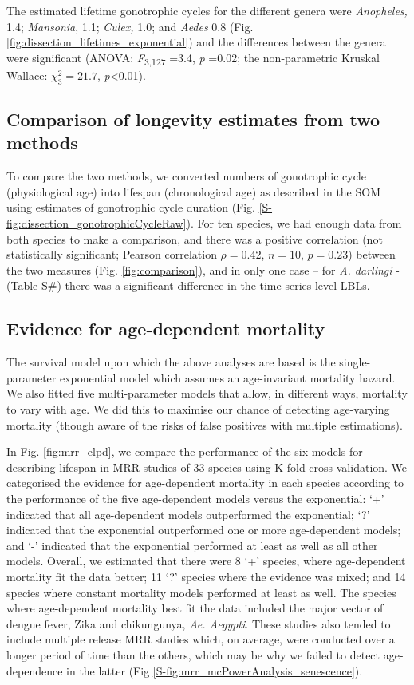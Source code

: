 \documentclass[]{article}
\begin{document}
The estimated lifetime gonotrophic cycles for the different genera were
\emph{Anopheles,} 1.4; \emph{Mansonia}, 1.1; \emph{Culex,} 1.0; and
\emph{Aedes} 0.8 (Fig. \ref{fig:dissection_lifetimes_exponential}) and the differences between the genera were
significant (ANOVA: \emph{F}\textsubscript{3,127} =3.4, \emph{p} =0.02;
the non-parametric Kruskal Wallace: \(\chi_{3}^{2} = 21.7\),
\emph{p}\textless{}0.01).

\subsection{Comparison of longevity estimates from two
methods}\label{comparison-of-longevity-estimates-from-two-methods}

To compare the two methods, we converted numbers of gonotrophic cycle
(physiological age) into lifespan (chronological age) as described in
the SOM using estimates of gonotrophic cycle duration (Fig. \ref{S-fig:dissection_gonotrophicCycleRaw}). For ten species, we had enough data from both
species to make a comparison, and there was a positive correlation (not
statistically significant; Pearson correlation $\rho=0.42$, $n=10$, $p=0.23$)
between the two measures (Fig. \ref{fig:comparison}), and in only one case -- for \emph{A.
darlingi} - (Table S\#) there was a significant difference in the
time-series level LBLs.

\subsection{Evidence for age-dependent
mortality}\label{evidence-for-age-dependent-mortality}

The survival model upon which the above analyses are based is the
single-parameter exponential model which assumes an age-invariant
mortality hazard. We also fitted five multi-parameter models that allow,
in different ways, mortality to vary with age. We did this to maximise
our chance of detecting age-varying mortality (though aware of the risks
of false positives with multiple estimations).

In Fig. \ref{fig:mrr_elpd}, we compare the performance of the six models for describing
lifespan in MRR studies of 33 species using K-fold cross-validation. We
categorised the evidence for age-dependent mortality in each species
according to the performance of the five age-dependent models versus the
exponential: `+' indicated that all age-dependent models outperformed
the exponential; `?' indicated that the exponential outperformed one or
more age-dependent models; and `-' indicated that the exponential
performed at least as well as all other models. Overall, we estimated
that there were 8 `+' species, where age-dependent mortality fit the
data better; 11 `?' species where the evidence was mixed; and 14 species
where constant mortality models performed at least as well. The species
where age-dependent mortality best fit the data included the major
vector of dengue fever, Zika and chikungunya, \emph{Ae. Aegypti}. These
studies also tended to include multiple release MRR studies which, on
average, were conducted over a longer period of time than the others,
which may be why we failed to detect age-dependence in the latter (Fig
\ref{S-fig:mrr_mcPowerAnalysis_senescence}).
\end{document}
